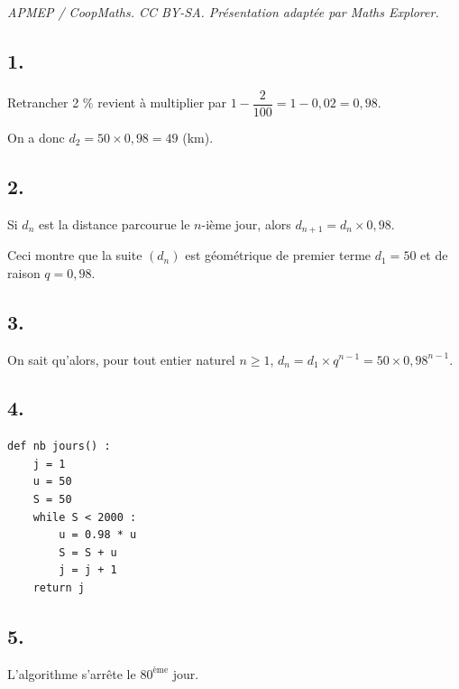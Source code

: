 \documentclass[10pt]{article}
\begin{document}
\noindent\textit{APMEP / CoopMaths. CC BY-SA. Présentation adaptée par Maths Explorer.}\par\medskip
\subsection*{1.}

Retrancher 2 \% revient à multiplier par \(1 - \dfrac{2}{100} = 1 - 0{,}02 = 0{,}98\).

On a donc \(d_2 = 50 \times 0{,}98 = 49\) (km).

\subsection*{2.}

Si \(d_n\) est la distance parcourue le \(n\)-ième jour, alors \(d_{n+1} = d_n \times 0{,}98\).

Ceci montre que la suite \((d_n)\) est géométrique de premier terme \(d_1 = 50\) et de raison \(q = 0{,}98\).

\subsection*{3.}

On sait qu'alors, pour tout entier naturel \(n \geqslant 1\), \(d_n = d_1 \times q^{n-1} = 50 \times 0{,}98^{n-1}\).

\subsection*{4.}

\begin{center}
\begin{lstlisting}[style=python]
def nb jours() :
    j = 1
    u = 50
    S = 50
    while S < 2000 :
        u = 0.98 * u
        S = S + u
        j = j + 1
    return j
\end{lstlisting}
\end{center}

\subsection*{5.}

L'algorithme s'arrête le \(80^{\text{ème}}\) jour.
\end{document}
